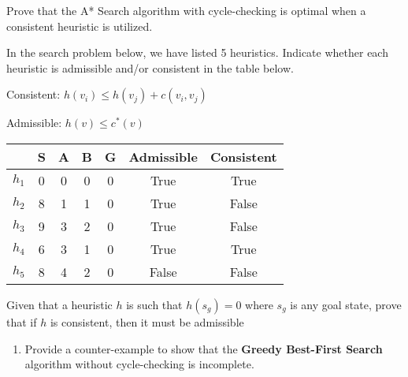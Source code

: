 \begin{listo}
\begin{listo}
        \item Prove that the A* Search algorithm with cycle-checking is optimal when a consistent heuristic is utilized.

        \item In the search problem below, we have listed 5 heuristics. Indicate whether each heuristic is admissible and/or consistent in the table below.

        \begin{remark}
            \begin{listu}
                \item Consistent: $h(v_i) \le h(v_j) + c(v_i, v_j)$

                \item Admissible: $h(v) \le c^*(v)$
            \end{listu}
        \end{remark}

        \begin{table}[ht!]
            \centering
        
            \begin{tabular}{||c|c|c|c|c|c|c||}
                \hline
                      & S & A & B & G & Admissible            & Consistent            \\ \hline \hline
                $h_1$ & 0 & 0 & 0 & 0 & \color{primary} True  & \color{primary} True  \\ \hline
                $h_2$ & 8 & 1 & 1 & 0 & \color{primary} True  & \color{primary} False \\ \hline
                $h_3$ & 9 & 3 & 2 & 0 & \color{primary} True  & \color{primary} False \\ \hline
                $h_4$ & 6 & 3 & 1 & 0 & \color{primary} True  & \color{primary} True  \\ \hline
                $h_5$ & 8 & 4 & 2 & 0 & \color{primary} False & \color{primary} False \\ \hline
            \end{tabular}
        \end{table}

        \item Given that a heuristic $h$ is such that $h(s_g) = 0$ where $s_g$ is any goal state, prove that if $h$ is consistent, then it must be admissible

        \item \begin{enumerate}[label=\alph*)]
            \item Provide a counter-example to show that the \textbf{Greedy Best-First Search} algorithm without cycle-checking is incomplete.


\end{enumerate}
\end{listo}
\end{listo}
